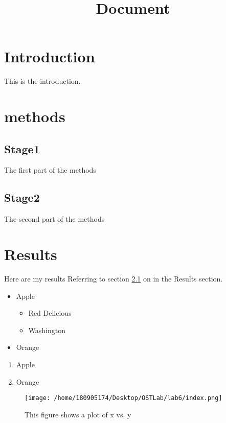 \documentclass[a4paper, 12 pt]{report}
\begin{document}
	\title{Document}
	\maketitle
	\section{Introduction}
	This is the introduction.
	\section{methods}
	\subsection{Stage1}
	\label{sec1}
	The first part of the methods
	\subsection{Stage2}
	The second part of the methods
	\section{Results}
	Here are my results
	Referring to section \ref{sec1} on \pageref{sec1} in the Results section.
	\tableofcontents
	\newpage
	\begin{itemize}
		\item Apple
		\begin{itemize}
			\item Red Delicious
			\item Washington
		\end{itemize}
		\item Orange
	\end{itemize}
    \begin{enumerate}
	    \item Apple
	    \item Orange
    \end{enumerate}
	\begin{figure}[h]
		\centering
		\texttt{[image: /home/180905174/Desktop/OSTLab/lab6/index.png]}
		\caption{This figure shows a plot of x vs. y}
		\label{Cross-reference_key}
	\end{figure}
\end{document}
